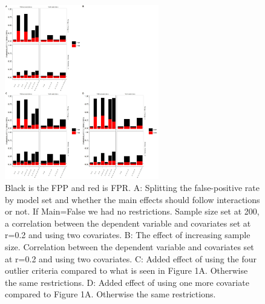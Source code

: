 \begin{figure}[t]
\includegraphics[width=0.6\textwidth]{R/Analysis/Result/Figures/Figure1.jpeg}
\centering
\caption{Black is the FPP and red is FPR. A: Splitting the false-positive rate by model set and whether the main effects should follow interactions or not. If Main=False we had no restrictions. Sample size set at 200, a correlation between the dependent variable and covariates set at r=0.2 and using two covariates. B: The effect of increasing sample size. Correlation between the dependent variable and covariates set at r=0.2 and using two covariates. C: Added effect of using the four outlier criteria compared to what is seen in Figure 1A. Otherwise the same restrictions. D: Added effect of using one more covariate compared to Figure 1A. Otherwise the same restrictions.}
\label{fig:mainfigure}
\end{figure}